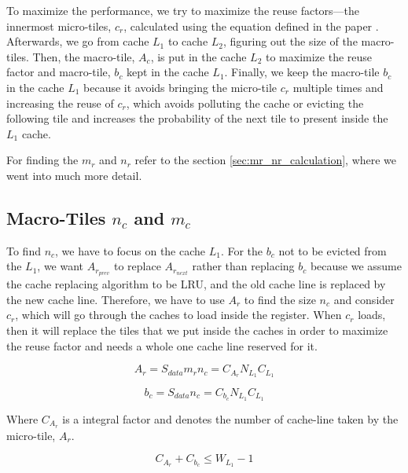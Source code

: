 To maximize the performance, we try to maximize the 
reuse factors—the innermost micro-tiles, $c_r$, calculated 
using the equation defined in the paper \cite{BLIS}. Afterwards, 
we go from cache $L_1$ to cache $L_2$, figuring 
out the size of the macro-tiles. Then, the macro-tile, 
$A_c$, is put in the cache $L_2$ to maximize the reuse 
factor and macro-tile, $b_c$ kept in the cache $L_1$. 
Finally, we keep the macro-tile $b_c$ in the cache $L_1$ 
because it avoids bringing the micro-tile $c_r$ multiple 
times and increasing the reuse of $c_r$, which avoids 
polluting the cache or evicting the following tile 
and increases the probability of the next tile to 
present inside the $L_1$ cache. 

For finding the $m_r$ and $n_r$ refer to the section \ref{sec:mr_nr_calculation}, where
we went into much more detail.

\subsection{Macro-Tiles $n_c$ and $m_c$}

To find $n_c$, we have to focus on the cache $L_1$. 
For the $b_c$ not to be evicted from the $L_1$, we 
want $A_{r_{prev}}$ to replace $A_{r_{next}}$ rather than replacing $b_c$ 
because we assume the cache replacing algorithm 
to be LRU, and the old cache line is replaced by the 
new cache line. Therefore, we have to use $A_r$ to 
find the size $n_c$ and consider $c_r$, which will go 
through the caches to load inside the register. 
When $c_r$ loads, then it will replace the tiles that 
we put inside the caches in order to maximize the 
reuse factor and needs a whole one cache line reserved for it.

\begin{equation}
    A_r = S_{data} m_r n_c = C_{A_r}N_{L_1}C_{L_1}
    \label{eq:mtv_ar}
\end{equation}

\begin{equation}
    b_c = S_{data} n_c = C_{b_c}N_{L_1}C_{L_1}
    \label{eq:mtv_bc}
\end{equation}

Where $C_{A_r}$ is a integral factor and denotes the number of cache-line taken by the
micro-tile, $A_r$.

\begin{equation}
    C_{A_r} + C_{b_c} \leq W_{L_1} - 1
    \label{eq:mtv_W}
\end{equation}

